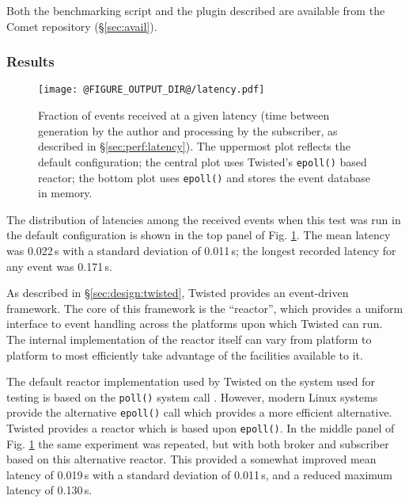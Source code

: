 \documentclass[5p,authoryear]{elsarticle}
\begin{document}
Both the benchmarking script and the plugin described are available from the
Comet repository (\S\ref{sec:avail}).

\subsubsection{Results}
\label{sec:perf:latency:results}

\begin{figure}
  \begin{center}
  \texttt{[image: @FIGURE\_OUTPUT\_DIR@/latency.pdf]}
  \end{center}

  \caption{Fraction of events received at a given latency (time between
  generation by the author and processing by the subscriber, as described in
  \S\ref{sec:perf:latency}). The uppermost plot reflects the default
  configuration; the central plot uses Twisted's \texttt{epoll()} based
  reactor; the bottom plot uses \texttt{epoll()} and stores the event database
  in memory.}

  \label{fig:latency}
\end{figure}

The distribution of latencies among the received events when this test was run
in the default configuration is shown in the top panel of Fig.
\ref{fig:latency}. The mean latency was 0.022\,s with a standard deviation of
0.011\,s; the longest recorded latency for any event was 0.171\,s.

As described in \S\ref{sec:design:twisted}, Twisted provides an event-driven
framework. The core of this framework is the ``reactor'', which provides a
uniform interface to event handling across the platforms upon which Twisted
can run. The internal implementation of the reactor itself can vary from
platform to platform to most efficiently take advantage of the facilities
available to it.

The default reactor implementation used by Twisted on the system used for
testing is based on the \texttt{poll()} system call \citep{Posix1:2013}.
However, modern Linux systems provide the alternative \texttt{epoll()} call
\citep{Kerrisk:2014} which provides a more efficient alternative. Twisted
provides a reactor which is based upon \texttt{epoll()}. In the middle panel of
Fig. \ref{fig:latency} the same experiment was repeated, but with both broker
and subscriber based on this alternative reactor. This provided a somewhat
improved mean latency of 0.019\,s with a standard deviation of 0.011\,s, and a
reduced maximum latency of 0.130\,s.
\end{document}
